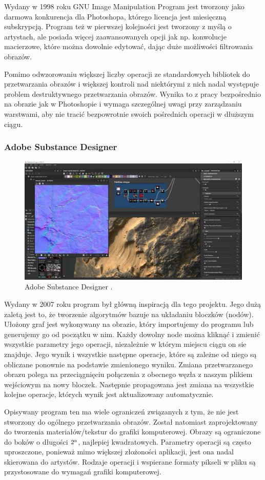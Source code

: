 Wydany w 1998 roku GNU Image Manipulation Program jest tworzony jako darmowa konkurencja dla Photoshopa, którego licencja jest miesięczną subskrypcją. Program też w pierwszej kolejności jest tworzony z myślą o artystach, ale posiada więcej zaawansowanych opcji jak np. konwolucje macierzowe, które można dowolnie edytować, dając duże możliwości filtrowania obrazów.

Pomimo odwzorowaniu większej liczby operacji ze standardowych bibliotek do przetwarzania obrazów i większej kontroli nad niektórymi z nich nadal występuje problem destruktywnego przetwarzania obrazów. Wynika to z pracy bezpośrednio na obrazie jak w Photoshopie i wymaga szczególnej uwagi przy zarządzaniu warstwami, aby nie tracić bezpowrotnie swoich pośrednich operacji w dłuższym ciągu.

\subsubsection{Adobe Substance Designer}
\begin{figure}[H]
    \centering
    \includegraphics{./images/Picture6.jpg}
    \caption{Adobe Substance Designer \cite{designer}.}
    \label{fig:designer}
\end{figure}

Wydany w 2007 roku program był główną inspiracją dla tego projektu. 
Jego dużą zaletą jest to, że tworzenie algorytmów bazuje na układaniu bloczków (nodów). 
Ułożony graf jest wykonywany na obrazie, który importujemy do programu lub generujemy go od początku w nim. 
Każdy dowolny node można kliknąć i zmienić wszystkie parametry jego operacji, niezależnie w którym miejscu ciągu on sie znajduje.
Jego wynik i wszystkie następne operacje, które są zależne od niego są obliczane ponownie na podstawie zmienionego wyniku. 
Zmiana przetwarzanego obrazu polega na przeciągnięciu połączenia z obecnego węzła z naszym plikiem wejściowym na nowy bloczek. Następnie propagowana jest zmiana na wszystkie kolejne operacje, których wynik jest aktualizowany automatycznie.

Opisywany program ten ma wiele ograniczeń związanych z tym, że nie jest stworzony do ogólnego przetwarzania obrazów. Został natomiast zaprojektowany do tworzenia materiałów/tekstur do grafiki komputerowej. 
Obrazy są ograniczone do boków o długości $2\textsuperscript{n}$, najlepiej kwadratowych. 
Parametry operacji są często uproszczone, ponieważ mimo większej złożoności aplikacji, jest ona nadal skierowana do artystów. 
Rodzaje operacji i wspierane formaty pikseli w pliku są przystosowane do wymagań grafiki komputerowej.
